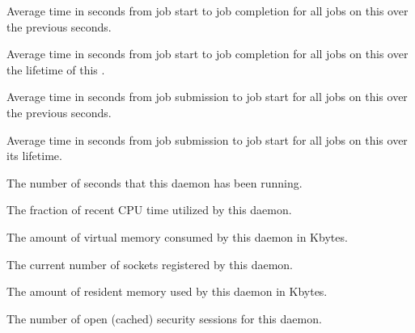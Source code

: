 \begin{description}
\item[\AdAttr{MeanRunningTime}:] Average time in seconds
  from job start to job completion for all jobs
  on this  over the previous  seconds.

\item[\AdAttr{MeanRunningTimeCumulative}:] Average time in seconds
  from job start to job completion for all jobs
  on this  over the lifetime of this .

\item[\AdAttr{MeanTimeToStart}:] Average time in seconds
  from job submission to job start for all jobs
  on this  over the previous  seconds.

\item[\AdAttr{MeanTimeToStartCumulative}:] Average time in seconds 
  from job submission to job start 
  for all jobs on this  over its lifetime.

\item[\AdAttr{MonitorSelfAge}:] The number of seconds that this daemon
  has been running.

\item[\AdAttr{MonitorSelfCPUUsage}:] The fraction of recent CPU time utilized
  by this daemon. 

\item[\AdAttr{MonitorSelfImageSize}:] The amount of virtual memory consumed by
  this daemon in Kbytes.

\item[\AdAttr{MonitorSelfRegisteredSocketCount}:] The current number of sockets
  registered by this daemon.

\item[\AdAttr{MonitorSelfResidentSetSize}:] The amount of resident memory
  used by this daemon in Kbytes.

\item[\AdAttr{MonitorSelfSecuritySessions}:] The number of open (cached)
  security sessions for this daemon.


\end{description}
